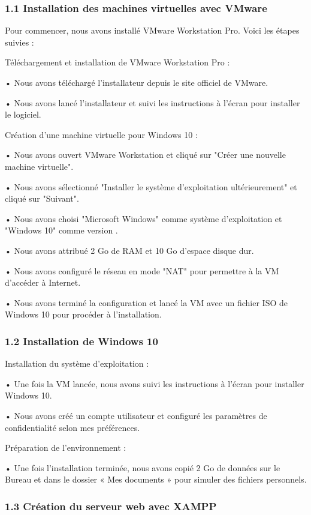 \documentclass[12pt,a4paper]{report}
\begin{document}
	
	\subsubsection{1.1 Installation des machines virtuelles avec VMware}

	Pour commencer, nous avons installé VMware Workstation Pro. Voici les étapes suivies :
	
		Téléchargement et installation de VMware Workstation Pro :
	
	• Nous avons téléchargé l'installateur depuis le site officiel de VMware.
	
	• Nous avons lancé l'installateur et suivi les instructions à l'écran pour installer le logiciel.
	
		Création d'une machine virtuelle pour Windows 10 :
	
	• Nous avons ouvert VMware Workstation et cliqué sur "Créer une nouvelle machine virtuelle".
	
	• Nous avons sélectionné "Installer le système d'exploitation ultérieurement" et cliqué sur "Suivant".
	
	• Nous avons choisi "Microsoft Windows" comme système d'exploitation et "Windows 10" comme version
	.
	
	• Nous avons attribué 2 Go de RAM et 10 Go d'espace disque dur.
	
	• Nous avons configuré le réseau en mode "NAT" pour permettre à la VM d'accéder à Internet.
	
	• Nous avons terminé la configuration et lancé la VM avec un fichier ISO de Windows 10 pour procéder à l'installation.
	
	\subsubsection{1.2 Installation de Windows 10}	
	
		Installation du système d'exploitation :
	
	• Une fois la VM lancée, nous avons suivi les instructions à l'écran pour installer Windows 10.
	
	• Nous avons créé un compte utilisateur et configuré les paramètres de confidentialité selon mes préférences.
	
		Préparation de l'environnement :
	
	• Une fois l'installation terminée, nous avons copié 2 Go de données sur le Bureau et dans le dossier « Mes documents » pour simuler des fichiers personnels.
	
\subsubsection{1.3 Création du serveur web avec XAMPP}	
	
\end{document}
